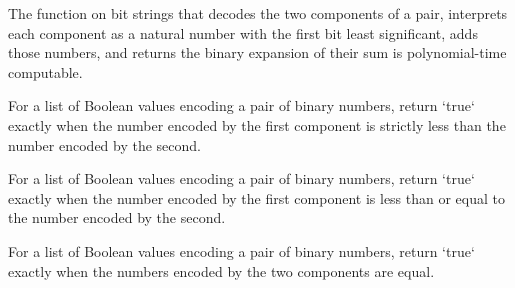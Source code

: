 \begin{theorem}
\label{Complexity.BinArith.polyTimeComputable_add}
\leanok
{}
The function on bit strings that decodes the two components of a pair, interprets each
component as a natural number with the first bit least significant, adds those numbers,
and returns the binary expansion of their sum is polynomial-time computable.
\end{theorem}

\begin{definition}
\label{Complexity.BinArith.lt}
\leanok
{}
For a list of Boolean values encoding a pair of binary numbers, return `true` exactly
when the number encoded by the first component is strictly less than the number encoded
by the second.
\end{definition}

\begin{definition}
\label{Complexity.BinArith.le}
\leanok
{}
For a list of Boolean values encoding a pair of binary numbers, return `true` exactly
when the number encoded by the first component is less than or equal to the number
encoded by the second.
\end{definition}

\begin{definition}
\label{Complexity.BinArith.beq}
\leanok
{}
For a list of Boolean values encoding a pair of binary numbers, return `true` exactly
when the numbers encoded by the two components are equal.
\end{definition}

